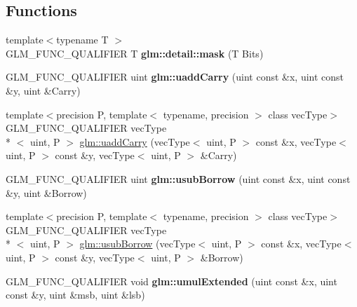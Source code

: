 \subsection*{Functions}
\begin{DoxyCompactItemize}
\item 
\hypertarget{namespaceglm_1_1detail_a048ad00e8777f9f3ebe185ed48857df0}{{\footnotesize template$<$typename T $>$ }\\G\-L\-M\-\_\-\-F\-U\-N\-C\-\_\-\-Q\-U\-A\-L\-I\-F\-I\-E\-R T {\bfseries glm\-::detail\-::mask} (T Bits)}\label{namespaceglm_1_1detail_a048ad00e8777f9f3ebe185ed48857df0}

\item 
\hypertarget{namespaceglm_a541d30d3289d3a3da69edec69df11a04}{G\-L\-M\-\_\-\-F\-U\-N\-C\-\_\-\-Q\-U\-A\-L\-I\-F\-I\-E\-R uint {\bfseries glm\-::uadd\-Carry} (uint const \&x, uint const \&y, uint \&Carry)}\label{namespaceglm_a541d30d3289d3a3da69edec69df11a04}

\item 
{\footnotesize template$<$precision P, template$<$ typename, precision $>$ class vec\-Type$>$ }\\G\-L\-M\-\_\-\-F\-U\-N\-C\-\_\-\-Q\-U\-A\-L\-I\-F\-I\-E\-R vec\-Type\\*
$<$ uint, P $>$ \hyperlink{group__core__func__integer_ga2fc1a46e7b7e9fbbd8fa444fbacaa2aa}{glm\-::uadd\-Carry} (vec\-Type$<$ uint, P $>$ const \&x, vec\-Type$<$ uint, P $>$ const \&y, vec\-Type$<$ uint, P $>$ \&Carry)
\item 
\hypertarget{namespaceglm_ac7a75ea277a43b855920597adeebb2e3}{G\-L\-M\-\_\-\-F\-U\-N\-C\-\_\-\-Q\-U\-A\-L\-I\-F\-I\-E\-R uint {\bfseries glm\-::usub\-Borrow} (uint const \&x, uint const \&y, uint \&Borrow)}\label{namespaceglm_ac7a75ea277a43b855920597adeebb2e3}

\item 
{\footnotesize template$<$precision P, template$<$ typename, precision $>$ class vec\-Type$>$ }\\G\-L\-M\-\_\-\-F\-U\-N\-C\-\_\-\-Q\-U\-A\-L\-I\-F\-I\-E\-R vec\-Type\\*
$<$ uint, P $>$ \hyperlink{group__core__func__integer_ga22a889bf08313b7e547e2cdb8bb15ee4}{glm\-::usub\-Borrow} (vec\-Type$<$ uint, P $>$ const \&x, vec\-Type$<$ uint, P $>$ const \&y, vec\-Type$<$ uint, P $>$ \&Borrow)
\item 
\hypertarget{namespaceglm_a8d2521311c96c4b426be9857010b6b76}{G\-L\-M\-\_\-\-F\-U\-N\-C\-\_\-\-Q\-U\-A\-L\-I\-F\-I\-E\-R void {\bfseries glm\-::umul\-Extended} (uint const \&x, uint const \&y, uint \&msb, uint \&lsb)}\label{namespaceglm_a8d2521311c96c4b426be9857010b6b76}


\end{DoxyCompactItemize}
